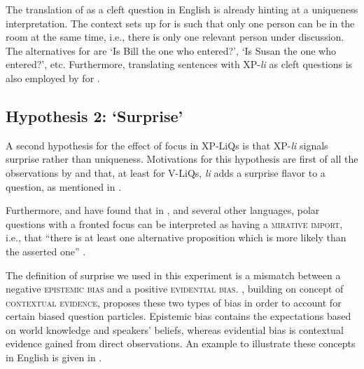 \documentclass[output=paper]{langscibook}
\begin{document}
\noindent
The translation of  as a cleft question in English is already hinting at a uniqueness interpretation. The context \citet{dukova2010} sets up for  is such that only one person can be in the room at the same time, i.e., there is only one relevant person under discussion. The alternatives for  are `Is Bill the one who entered?', `Is Susan the one who entered?', etc. Furthermore, translating sentences with XP-\textit{li} as cleft questions is also employed by \citet{king1994} for .



\subsection{Hypothesis 2: `Surprise'}\label{sec:surprise}
A second hypothesis for the effect of focus in XP-LiQs is that XP-\textit{li} signals surprise rather than uniqueness. Motivations for this hypothesis are first of all the observations by \citet{Rudin.Kramer.Billings.Baerman1999} and \citet{lazarova2003} that, at least for V-LiQs, \textit{li} adds a surprise flavor to a question, as mentioned in .


Furthermore, \citet{bianchi.cruschina2016} and \citet{bianchi.bocci.cruschina2016} have found that in , and several other languages, polar questions with a fronted focus can be interpreted as having a \textsc{mirative import}, i.e., that ``there is at least one alternative proposition which is more likely than the asserted one'' \citep[60]{bianchi.cruschina2016}.

The definition of surprise we used in this experiment is a mismatch between a negative \textsc{epistemic bias}  and a positive \textsc{evidential bias}. \citet{sudo2013}, building on  concept of \textsc{contextual evidence}, proposes these two types of bias in order to account for certain  biased question particles.
Epistemic bias contains the expectations based on world knowledge and speakers' beliefs, whereas evidential bias is contextual evidence gained from direct observations. An example to illustrate these concepts in English is given in .
\end{document}

